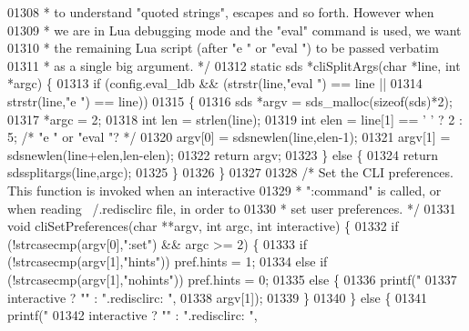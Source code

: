 \begin{DoxyCode}
{{{{{{{{{{{{{{{{{{{{{{{{{{{{{{{{{{01308 \textcolor{comment}{ * to understand "quoted strings", escapes and so forth. However when}
01309 \textcolor{comment}{ * we are in Lua debugging mode and the "eval" command is used, we want}
01310 \textcolor{comment}{ * the remaining Lua script (after "e " or "eval ") to be passed verbatim}
01311 \textcolor{comment}{ * as a single big argument. */}
01312 \textcolor{keyword}{static} sds *cliSplitArgs(\textcolor{keywordtype}{char} *line, \textcolor{keywordtype}{int} *argc) \{
01313     \textcolor{keywordflow}{if} (config.eval\_ldb && (strstr(line,\textcolor{stringliteral}{"eval "}) == line ||
01314                             strstr(line,\textcolor{stringliteral}{"e "}) == line))
01315     \{
01316         sds *argv = sds\_malloc(\textcolor{keyword}{sizeof}(sds)*2);
01317         *argc = 2;
01318         \textcolor{keywordtype}{int} len = strlen(line);
01319         \textcolor{keywordtype}{int} elen = line[1] == \textcolor{stringliteral}{' '} ? 2 : 5; \textcolor{comment}{/* "e " or "eval "? */}
01320         argv[0] = sdsnewlen(line,elen-1);
01321         argv[1] = sdsnewlen(line+elen,len-elen);
01322         \textcolor{keywordflow}{return} argv;
01323     \} \textcolor{keywordflow}{else} \{
01324         \textcolor{keywordflow}{return} sdssplitargs(line,argc);
01325     \}
01326 \}
01327 
01328 \textcolor{comment}{/* Set the CLI preferences. This function is invoked when an interactive}
01329 \textcolor{comment}{ * ":command" is called, or when reading ~/.redisclirc file, in order to}
01330 \textcolor{comment}{ * set user preferences. */}
01331 \textcolor{keywordtype}{void} cliSetPreferences(\textcolor{keywordtype}{char} **argv, \textcolor{keywordtype}{int} argc, \textcolor{keywordtype}{int} interactive) \{
01332     \textcolor{keywordflow}{if} (!strcasecmp(argv[0],\textcolor{stringliteral}{":set"}) && argc >= 2) \{
01333         \textcolor{keywordflow}{if} (!strcasecmp(argv[1],\textcolor{stringliteral}{"hints"})) pref.hints = 1;
01334         \textcolor{keywordflow}{else} \textcolor{keywordflow}{if} (!strcasecmp(argv[1],\textcolor{stringliteral}{"nohints"})) pref.hints = 0;
01335         \textcolor{keywordflow}{else} \{
01336             printf(\textcolor{stringliteral}{"%
01337                 interactive ? \textcolor{stringliteral}{""} : \textcolor{stringliteral}{".redisclirc: "},
01338                 argv[1]);
01339         \}
01340     \} \textcolor{keywordflow}{else} \{
01341         printf(\textcolor{stringliteral}{"%
01342             interactive ? \textcolor{stringliteral}{""} : \textcolor{stringliteral}{".redisclirc: "},
}}}}}}}}}}}}}}}}}}}}}}}}}}}}}}}}}}}}
\end{DoxyCode}
